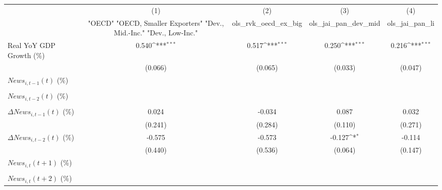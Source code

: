 {
\def\sym#1{\ifmmode^{#1}\else\(^{#1}\)\fi}
\begin{tabular}{l*{4}{c}}
\toprule
                    &\multicolumn{1}{c}{(1)}&\multicolumn{1}{c}{(2)}&\multicolumn{1}{c}{(3)}&\multicolumn{1}{c}{(4)}\\
                    &\multicolumn{1}{c}{ "OECD" "OECD, Smaller Exporters" "Dev., Mid.-Inc." "Dev., Low-Inc."}&\multicolumn{1}{c}{ols_rvk_oecd_ex_big}&\multicolumn{1}{c}{ols_jai_pan_dev_mid}&\multicolumn{1}{c}{ols_jai_pan_li}\\
\midrule
Real YoY GDP Growth (\%)&       0.540\sym{***}&       0.517\sym{***}&       0.250\sym{***}&       0.216\sym{***}\\
                    &     (0.066)         &     (0.065)         &     (0.033)         &     (0.047)         \\
\addlinespace
$ News_{i,t-1}(t)$ (\%)&                     &                     &                     &                     \\
                    &                     &                     &                     &                     \\
\addlinespace
$ News_{i,t-2}(t)$ (\%)&                     &                     &                     &                     \\
                    &                     &                     &                     &                     \\
\addlinespace
$ \Delta News_{i,t-1}(t)$ (\%)&       0.024         &      -0.034         &       0.087         &       0.032         \\
                    &     (0.241)         &     (0.284)         &     (0.110)         &     (0.271)         \\
\addlinespace
$ \Delta News_{i,t-2}(t)$ (\%)&      -0.575         &      -0.573         &      -0.127\sym{*}  &      -0.114         \\
                    &     (0.440)         &     (0.536)         &     (0.064)         &     (0.147)         \\
\addlinespace
$ News_{i,t}(t+1)$ (\%)&                     &                     &                     &                     \\
                    &                     &                     &                     &                     \\
\addlinespace
$ News_{i,t}(t+2)$ (\%)&                     &                     &                     &                     \\

\end{tabular}}
